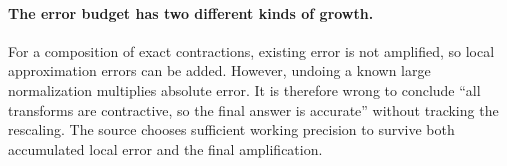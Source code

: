 \paragraph{The error budget has two different kinds of growth.}
For a composition of exact contractions, existing error is not amplified,
so local approximation errors can be added. However, undoing a known large
normalization multiplies absolute error. It is therefore wrong to conclude
``all transforms are contractive, so the final answer is accurate'' without
tracking the rescaling. The source chooses sufficient working precision to
survive both accumulated local error and the final amplification.

